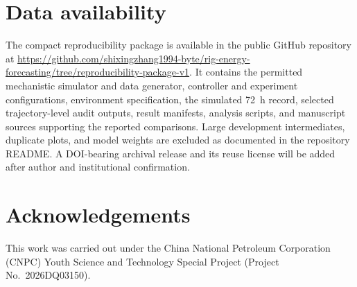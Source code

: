 \documentclass[preprint,12pt]{elsarticle}
\DeclareRobustCommand{\?}[1]{\u{#1}}
\DeclareRobustCommand{\>}[1]{\c{#1}}
\begin{document}
\section*{Data availability}
The compact reproducibility package is available in the public GitHub repository
at \url{https://github.com/shixingzhang1994-byte/rig-energy-forecasting/tree/reproducibility-package-v1}.
It contains the permitted mechanistic simulator and data generator, controller
and experiment configurations, environment specification, the simulated 72~h
record, selected trajectory-level audit outputs, result manifests, analysis
scripts, and manuscript sources supporting the reported comparisons. Large
development intermediates, duplicate plots, and model weights are excluded as
documented in the repository README. A DOI-bearing archival release and its
reuse license will be added after author and institutional confirmation.

\section*{Acknowledgements}
This work was carried out under the China National Petroleum Corporation
(CNPC) Youth Science and Technology Special Project (Project
No.~2026DQ03150).



\end{document}
